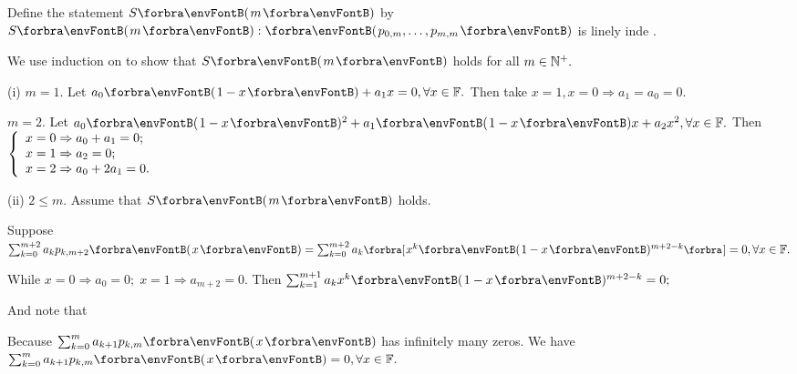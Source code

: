 Define the statement $S\Par{m}$ by $S\Par{m}:\Par{p_{0,m},\dots,p_{m,m}}$ is linely inde .\par\quad
We use induction on to show that $S\Par{m}$ holds for all $m\in\Nbp.$\vspace{4pt}\par\quad
(i) $m=1.$ \;Let $a_0\Par{1-x}+a_1x=0,\forall x\in\Fbb.$ \;Then take $x=1,x=0\Rightarrow a_1=a_0=0.$\par\quad\Hi
$m=2.$ \;Let $a_0\Par{1-x}{^2}+a_1\Par{1-x}x+a_2x^2,\forall x\in\Fbb.$ \;Then $\MathLeftBrace{l}{x=0\Rightarrow a_0+a_1=0;\\x=1\Rightarrow a_2=0;\\x=2\Rightarrow a_0+2a_1=0.}$\par\quad\Endi
(ii) $2\leqslant m.$ \;Assume that $S\Par{m}$ holds.\vspace{2pt}\par\quad\Hii
Suppose $\sum_{k=0}^{m+2}a_kp_{k,m+2}\Par{x}=\sum_{k=0}^{m+2}a_k\Sbra{x^k\Par{1-x}{^{m+2-k}}}=0,\forall x\in\Fbb.$\vspace{4pt}\par\quad\Hii
{}\par\quad\Hii
{\vspace{6pt}While {\Large\uline{$x=0\Rightarrow a_0=0;\;x=1\Rightarrow a_{m+2}=0.$}} Then {\Large$\sum_{k=1}^{m+1}a_kx^k\Par{1-x}{^{m+2-k}}=0;$}}\par\quad\Hii
{\vspace{6pt}And note that \Large{}}\vspace{4pt}\par\quad\Hii
{}\par\quad\Hii
{\vspace{4pt}Because $\sum_{k=0}^{m}a_{k+1}p_{k,m}\Par{x}$ has infinitely many zeros. We have $\sum_{k=0}^{m}a_{k+1}p_{k,m}\Par{x}=0,\forall x\in\Fbb.$}\par\quad\Hii
